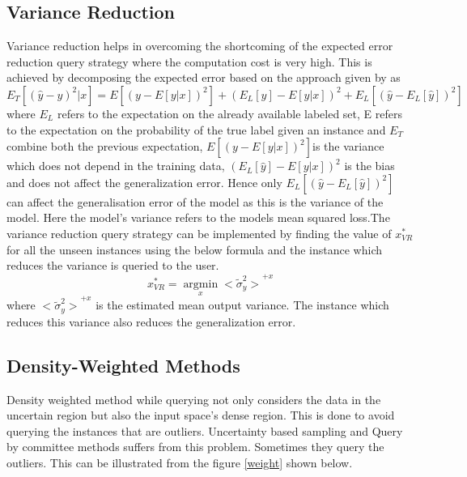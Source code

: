 \subsection{Variance Reduction}
Variance reduction helps in overcoming the shortcoming of the expected error reduction query strategy where the computation cost is very high. This is achieved by decomposing the expected error based on the approach given by \cite{geman1992neural} as 
\begin{equation} 
E_T[(\hat{y} - y)^2|x] = E[(y - E[y|x])^2] + (E_L[\hat{y}] - E[y|x])^2 + E_L [(\hat{y} - E_L[\hat{y}])^2]
\end{equation} 
where $E_L$  refers to the expectation on the already available labeled set, E refers to the expectation on the probability of the true label given  an instance and $E_T$ combine both the previous expectation, $E[(y - E[y|x])^2] $is the variance which does not depend in the training data, $(E_L[\hat{y}] - E[y|x])^2$ is the bias and does not affect the generalization error. Hence only $E_L [(\hat{y} - E_L[\hat{y}])^2] $ can affect the generalisation error of the model as this is the variance of the model. Here the model’s variance refers to the models mean squared loss.The variance reduction query strategy can be implemented by finding the value of $x^*_{VR}$ for all the unseen instances using the below formula and the instance which reduces the variance is queried to the user. 
\begin{equation}  
x^*_{VR} =  \operatorname*{argmin}_x {<\widetilde{\sigma}^2_y >}^{+x} 
\end{equation} 
where ${<\widetilde{\sigma}^2_y >}^{+x}$ is the estimated mean output variance. The instance which reduces this variance also reduces the generalization error. \cite{Settles2010} \cite{chaloner1995bayesian} \cite{cohn1995active}

\subsection{Density-Weighted Methods}
Density weighted method while querying not only considers the data in the uncertain region but also the input space’s dense region. This is done to avoid querying the instances that are outliers. Uncertainty based sampling and Query by committee methods suffers from this problem. Sometimes they query the outliers. This can be illustrated from the figure \ref{weight} shown below.

